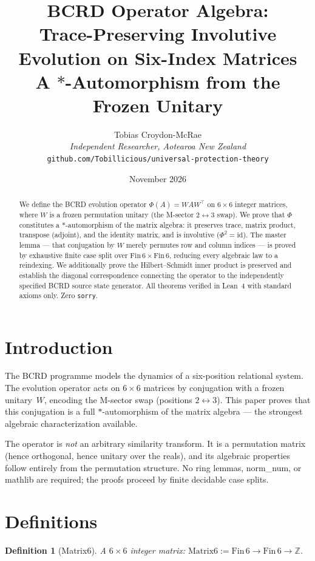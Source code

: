 \documentclass[12pt,a4paper]{article}
\title{BCRD Operator Algebra:\\[0.3em]
Trace-Preserving Involutive Evolution on Six-Index Matrices\\[0.5em]
\large A $*$-Automorphism from the Frozen Unitary}
\author{Tobias Croydon-McRae\\
\textit{Independent Researcher, Aotearoa New Zealand}\\
\texttt{github.com/Tobillicious/universal-protection-theory}}
\date{November 2026}
\newtheorem{definition}[theorem]{Definition}
\begin{document}
\maketitle

\begin{abstract}
We define the BCRD evolution operator $\Phi(A) = W A W^\top$ on
$6 \times 6$ integer matrices, where $W$ is a frozen permutation
unitary (the M-sector $2 \leftrightarrow 3$ swap). We prove that
$\Phi$ constitutes a $*$-automorphism of the matrix algebra:
it preserves trace, matrix product, transpose (adjoint), and the
identity matrix, and is involutive ($\Phi^2 = \mathrm{id}$). The
master lemma --- that conjugation by $W$ merely permutes row and
column indices --- is proved by exhaustive finite case split over
$\mathrm{Fin}\, 6 \times \mathrm{Fin}\, 6$, reducing every
algebraic law to a reindexing. We additionally prove the
Hilbert--Schmidt inner product is preserved and establish the
diagonal correspondence connecting the operator to the independently
specified BCRD source state generator. All theorems verified in
Lean~4 with standard axioms only. Zero \texttt{sorry}.
\end{abstract}

\section{Introduction}

The BCRD programme models the dynamics of a six-position relational
system. The evolution operator acts on $6 \times 6$ matrices by
conjugation with a frozen unitary~$W$, encoding the M-sector swap
(positions $2 \leftrightarrow 3$). This paper proves that this
conjugation is a full $*$-automorphism of the matrix algebra ---
the strongest algebraic characterization available.

The operator is \emph{not} an arbitrary similarity transform. It is
a permutation matrix (hence orthogonal, hence unitary over the reals),
and its algebraic properties follow entirely from the permutation
structure. No ring lemmas, norm\_num, or mathlib are required; the
proofs proceed by finite decidable case splits.

\section{Definitions}

\begin{definition}[Matrix6]
A $6 \times 6$ integer matrix: $\text{Matrix6} := \mathrm{Fin}\, 6 \to
\mathrm{Fin}\, 6 \to \mathbb{Z}$.
\end{definition}
\end{document}

